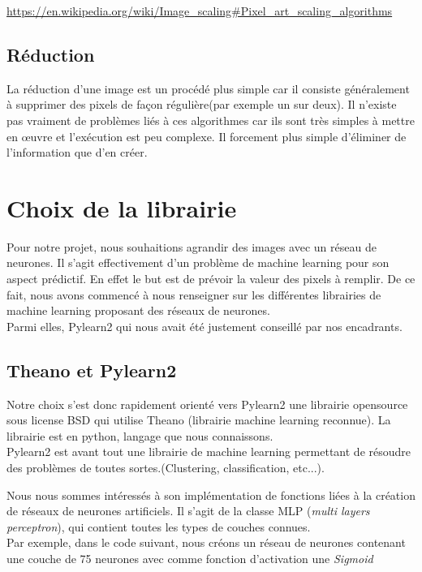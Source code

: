 \documentclass[12pt, a4paper]{article}
\begin{document}
\url{https://en.wikipedia.org/wiki/Image_scaling#Pixel_art_scaling_algorithms}

\subsection{Réduction}

La réduction d'une image est un procédé plus simple car il consiste généralement à supprimer des pixels de façon régulière(par exemple un sur deux). Il n'existe pas vraiment de problèmes liés à ces algorithmes car ils sont très simples à mettre en œuvre et l'exécution est peu complexe. Il forcement plus simple d'éliminer de l'information que d'en créer.


\section{Choix de la librairie}

Pour notre projet, nous souhaitions agrandir des images avec un réseau de neurones. Il s'agit effectivement d'un problème de machine learning pour son aspect prédictif. En effet le but est de prévoir la valeur des pixels à remplir. De ce fait, nous avons commencé à nous renseigner sur les différentes librairies de machine learning proposant des réseaux de neurones. \\ Parmi elles, Pylearn2 qui nous avait été justement conseillé par nos encadrants. 

\subsection{Theano et Pylearn2}
Notre choix s'est donc rapidement orienté vers Pylearn2 une librairie opensource sous license BSD qui utilise Theano (librairie machine learning reconnue). La librairie est en python, langage que nous connaissons. 
\\

Pylearn2 est avant tout une librairie de machine learning permettant de résoudre des problèmes de toutes sortes.(Clustering, classification, etc...).

Nous nous sommes intéressés à son implémentation de fonctions liées à la création de réseaux de neurones artificiels. Il s'agit de la classe MLP (\emph{multi layers perceptron}), qui contient toutes les types de couches connues. \\ Par exemple, dans le code suivant, nous créons un réseau de neurones contenant une couche de 75 neurones avec comme fonction d'activation une \emph{Sigmoid}
\end{document}

